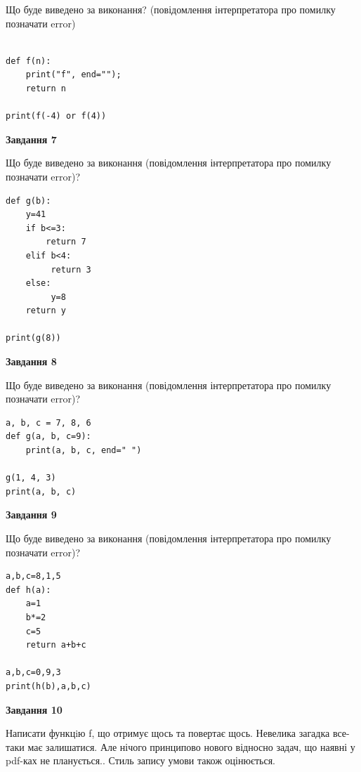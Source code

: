 \documentclass[12pt, ukrainian]{article}
\begin{document}
{\begin {large}
Що буде виведено за виконання? (повідомлення інтерпретатора про помилку позначати error)\par
\begin{verbatim}

def f(n):
    print("f", end="");
    return n

print(f(-4) or f(4))
\end{verbatim}

{\begin {center}\textbf{Завдання 7}\end {center}}

Що буде виведено за виконання (повідомлення інтерпретатора про помилку позначати error)?\par
\begin{verbatim}
def g(b):
    y=41
    if b<=3: 
        return 7
    elif b<4:
         return 3
    else:
         y=8
    return y

print(g(8))
\end{verbatim}

{\begin {center}\textbf{Завдання 8}\end {center}}

Що буде виведено за виконання (повідомлення інтерпретатора про помилку позначати error)?\par
\begin{verbatim}
a, b, c = 7, 8, 6
def g(a, b, c=9):
    print(a, b, c, end=" ")

g(1, 4, 3)
print(a, b, c)
\end{verbatim}

{\begin {center}\textbf{Завдання 9}\end {center}}

Що буде виведено за виконання (повідомлення інтерпретатора про помилку позначати error)?\par
\begin{verbatim}
a,b,c=8,1,5
def h(a):
    a=1
    b*=2
    c=5
    return a+b+c

a,b,c=0,9,3
print(h(b),a,b,c)
\end{verbatim}

{\begin {center}\textbf{Завдання 10}\end {center}}


Написати функцiю f, що отримує щось та повертає щось. Невелика загадка все-таки має залишатися. Але нічого принципово нового відносно задач, що наявні у pdf-ках не планується.. Стиль запису умови також оцінюється.\par
\end {large}}
\newpage
\end{document}
